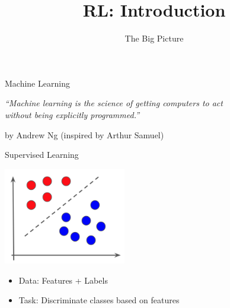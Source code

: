 \documentclass[aspectratio=169]{../latex_main/tntbeamer}  %
\title[ML-RL: Big Picture]{RL: Introduction}
\subtitle{The Big Picture}
\begin{document}
	
	\maketitle

\begin{frame}[c]{Machine Learning}

\centering
\begin{Large}
    \textit{``Machine learning is the science of getting computers to act\\
    without being explicitly programmed.''}    
\end{Large}


\hfill by Andrew Ng (inspired by Arthur Samuel)

\end{frame}
\begin{frame}[c]{Supervised Learning}
	
\centering
\includegraphics[width=0.4\textwidth]{images/classification.png}

\bigskip

\begin{itemize}
	\item Data: Features + Labels
	\item Task: Discriminate classes based on features
\end{itemize}	

	
\end{frame}
\end{document}
